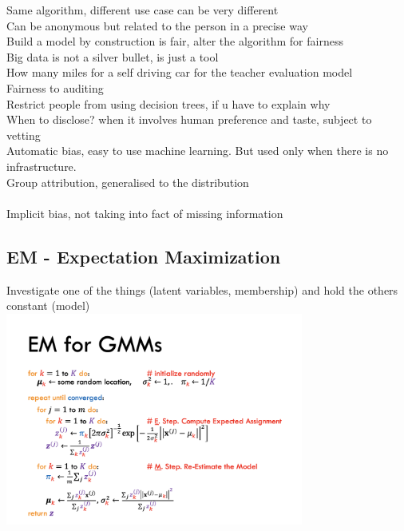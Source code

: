 \documentclass[11pt]{article}
\begin{document}
Same algorithm, different use case can be very different\\
Can be anonymous but related to the person in a precise way\\
Build a model by construction is fair, alter the algorithm for fairness\\
Big data is not a silver bullet, is just a tool\\
How many miles for a self driving car for the teacher evaluation model
\\
Fairness to auditing\\
Restrict people from using decision trees, if u have to explain why\\
When to disclose? when it involves human preference and taste, subject to vetting
\\
Automatic bias, easy to use machine learning. But used only when there is no infrastructure.
\\
Group attribution, generalised to the distribution\\
\\
Implicit bias, not taking into fact of missing information
\subsection*{EM - Expectation Maximization}
Investigate one of the things (latent variables, membership) and hold the others constant (model)\\

\includegraphics[height=7cm]{images/s5.png}
\end{document}
